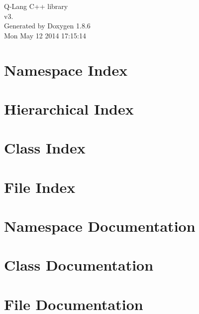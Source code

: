 \documentclass[twoside]{book}
\newcommand{\clearemptydoublepage}{%
  \newpage{\pagestyle{empty}\cleardoublepage}%
}
\begin{document}
\hypersetup{pageanchor=false}
\begin{titlepage}
\vspace*{7cm}
\begin{center}%
{\Large Q-\/\-Lang C++ library \\[1ex]\large v3. }\\
\vspace*{1cm}
{\large Generated by Doxygen 1.8.6}\\
\vspace*{0.5cm}
{\small Mon May 12 2014 17:15:14}\\
\end{center}
\end{titlepage}
\clearemptydoublepage
\tableofcontents
\clearemptydoublepage
{}
\hypersetup{pageanchor=true}

\chapter{Namespace Index}

\chapter{Hierarchical Index}

\chapter{Class Index}

\chapter{File Index}

\chapter{Namespace Documentation}



\chapter{Class Documentation}



















\chapter{File Documentation}



\newpage
{}
{}
\printindex
\end{document}
